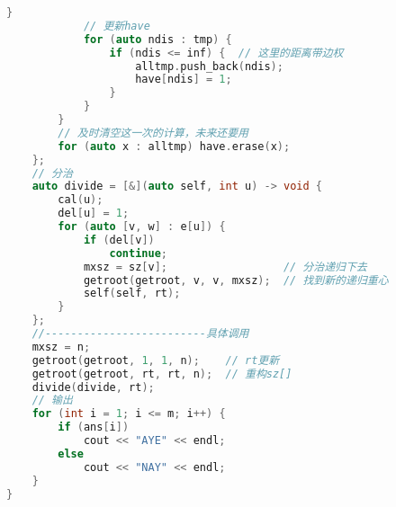 \begin{lstlisting}[language=C++]
            }
            // 更新have
            for (auto ndis : tmp) {
                if (ndis <= inf) {  // 这里的距离带边权
                    alltmp.push_back(ndis);
                    have[ndis] = 1;
                }
            }
        }
        // 及时清空这一次的计算，未来还要用
        for (auto x : alltmp) have.erase(x);
    };
    // 分治
    auto divide = [&](auto self, int u) -> void {
        cal(u);
        del[u] = 1;
        for (auto [v, w] : e[u]) {
            if (del[v])
                continue;
            mxsz = sz[v];                  // 分治递归下去
            getroot(getroot, v, v, mxsz);  // 找到新的递归重心
            self(self, rt);
        }
    };
    //-------------------------具体调用
    mxsz = n;
    getroot(getroot, 1, 1, n);    // rt更新
    getroot(getroot, rt, rt, n);  // 重构sz[]
    divide(divide, rt);
    // 输出
    for (int i = 1; i <= m; i++) {
        if (ans[i])
            cout << "AYE" << endl;
        else
            cout << "NAY" << endl;
    }
}
\end{lstlisting}
